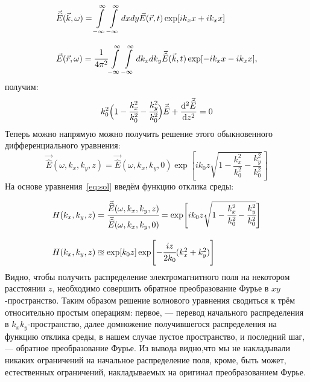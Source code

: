 \begin{equation}
\label{eq:Fourier_rk}
\begin{array}{lcl}
\vec{\widehat{E}}(\vec{k}, \omega) = \displaystyle\int\limits_{-\infty}^{\infty}\int\limits_{-\infty}^{\infty} dxdy \vec{E}(\vec{r}, t)\exp[ik_xx + ik_xx]\\
\\
\vec{E}(\vec{r}, \omega) = \cfrac{1}{4\pi^2}\displaystyle\int\limits_{-\infty}^{\infty}\int\limits_{-\infty}^{\infty} dk_xdk_y \vec{\widehat{E}}(\vec{k}, t)\exp[-ik_xx - ik_xx],
\end{array}
\end{equation}
получим: 
\begin{equation}
k_0^2\Big(1 - \cfrac{k^2_x}{k^2_0} - \cfrac{k^2_y}{k^2_0} \Big)\vec{\widehat{E}} + \dv[2]{\vec{\widehat{E}}}{z} = 0
\end{equation}
Теперь можно напрямую можно получить решение этого обыкновенного дифференциального уравнения:
\begin{equation}
\label{eq:sol}
\vec{\widehat{E}}(\omega, k_x, k_y, z) = \vec{\widehat{E}}(\omega, k_x, k_y, 0)\exp[ik_0z\sqrt{1 - \frac{k^2_x}{k^2_0} - \frac{k^2_y}{k^2_0}} ]
\end{equation}
На основе уравнения~\ref{eq:sol} введём функцию отклика среды:

\begin{equation}
\begin{array}{lcl}
H(k_x, k_y, z) = \cfrac{\vec{\widehat{E}}(\omega, k_x, k_y, z)}{\vec{\widehat{E}}(\omega, k_x, k_y, 0)} = \exp[ik_0z\sqrt{1 - \cfrac{k^2_x}{k^2_0} - \cfrac{k^2_y}{k^2_0}} ]
\\
\\
H(k_x, k_y, z) \approxeq \exp[k_0z]\exp[-\cfrac{iz}{2k_0}(k^2_x + k^2_y)]
\end{array}
\end{equation}
Видно, чтобы получить распределение электромагнитного поля на некотором расстоянии $z$, необходимо совершить обратное преобразование Фурье в $xy$-пространство. Таким образом решение волнового уравнения сводиться к трём относительно простым операциям: первое, --- перевод начального распределения в $k_xk_y$-пространство, далее домножение получившегося распределения на функцию отклика среды, в нашем случае пустое пространство, и последний шаг, --- обратное преобразование Фурье. Из вывода видно,что мы не накладывали никаких ограничений на начальное распределение поля, кроме, быть может, естественных ограничений, накладываемых на оригинал преобразованием Фурье.

